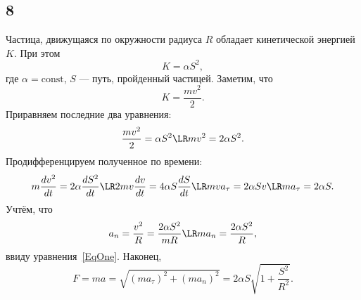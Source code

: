 \subsection{8}

Частица, движущаяся по окружности радиуса $R$ обладает кинетической энергией $K$. При этом
\[
K=\alpha S^2,
\]
где $\alpha=\text{const}$, $S$ --- путь, пройденный частицей. Заметим, что
\[
K=\frac{mv^2}{2}.
\]
Приравняем последние два уравнения:
\begin{equation}\label{EqOne}
\frac{mv^2}{2}=\alpha S^2\LR mv^2=2\alpha S^2.
\end{equation}
Продифференцируем полученное по времени:
\[
m\frac{d v^2}{dt}=2\alpha\frac{dS^2}{dt}\LR 2mv\frac{dv}{dt}=4\alpha S\frac{dS}{dt}\LR mva_\tau=2\alpha Sv\LR ma_\tau=2\alpha S.
\]
Учтём, что
\[
a_n=\frac{v^2}{R}=\frac{2\alpha S^2}{mR}\LR ma_n=\frac{2\alpha S^2}{R},
\]
ввиду уравнения~\eqref{EqOne}. Наконец,
\[
F=ma=\sqrt{(ma_\tau)^2+(ma_n)^2}=2\alpha S\sqrt{1+\frac{S^2}{R^2}}.
\]